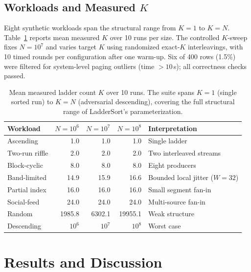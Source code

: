 \documentclass[12pt,a4paper]{article}
\theoremstyle{plain}
\theoremstyle{definition}
\begin{document}
\subsection{Workloads and Measured $K$}
\label{sec:workloads}

Eight synthetic workloads span the structural range from $K=1$ to $K=N$.
Table~\ref{tab:measured-k} reports mean measured $K$ over 10 runs per size.
The controlled $K$-sweep fixes $N=10^7$ and varies target $K$ using
randomized exact-$K$ interleavings, with 10 timed rounds per configuration
after one warm-up.  Six of 400 rows (1.5\%) were filtered for system-level
paging outliers (time $> 10$\,s); all correctness checks passed.

\begin{table}[H]
\centering
\small
\caption{Mean measured ladder count $K$ over 10 runs. The suite spans
  $K=1$ (single sorted run) to $K=N$ (adversarial descending), covering the
  full structural range of LadderSort's parameterization.}
\label{tab:measured-k}
\begin{tabularx}{\linewidth}{@{}lrrrX@{}}
\toprule
Workload & $N=10^6$ & $N=10^7$ & $N=10^8$ & Interpretation \\
\midrule
Ascending       & 1.0    & 1.0    & 1.0     & Single ladder \\
Two-run riffle  & 2.0    & 2.0    & 2.0     & Two interleaved streams \\
Block-cyclic    & 8.0    & 8.0    & 8.0     & Eight producers \\
Band-limited    & 14.9   & 15.9   & 16.6    & Bounded local jitter ($W=32$) \\
Partial index   & 16.0   & 16.0   & 16.0    & Small segment fan-in \\
Social-feed     & 24.0   & 24.0   & 24.0    & Multi-source fan-in \\
Random          & 1985.8 & 6302.1 & 19955.1 & Weak structure \\
Descending      & $10^6$ & $10^7$ & $10^8$  & Worst case \\
\bottomrule
\end{tabularx}
\end{table}

\section{Results and Discussion}
\label{sec:results}
\end{document}
